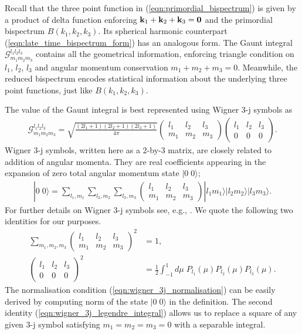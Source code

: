 Recall that the three point function in (\ref{eqn:primordial_bispectrum}) is given by a product of delta function enforcing $\mathbf{k}_1 + \mathbf{k}_2 + \mathbf{k}_3 = \mathbf{0}$ and the primordial bispectrum $B(k_1,k_2,k_3)$. Its spherical harmonic counterpart (\ref{eqn:late_time_bispectrum_form}) has an analogous form. The Gaunt integral $\mathcal{G}^{l_1 l_2 l_3}_{m_1 m_2 m_3}$ contains all the geometrical information, enforcing triangle condition on $l_1$, $l_2$, $l_3$ and angular momentum conservation $m_1+m_2+m_3=0$. Meanwhile, the reduced bispectrum encodes statistical information about the underlying three point functions, just like $B(k_1,k_2,k_3)$.

The value of the Gaunt integral is best represented using Wigner 3-j symbols as
\begin{align}
	\mathcal{G}^{l_1 l_2 l_3}_{m_1 m_2 m_3} = \sqrt{\frac{(2l_1+1)(2l_2+1)(2l_3+1)}{4\pi}} \begin{pmatrix}	l_1 & l_2 & l_3 \\ m_1 & m_2 & m_3 \end{pmatrix} \begin{pmatrix}	l_1 & l_2 & l_3 \\ 0 & 0 & 0 \end{pmatrix}.
\end{align}
Wigner 3-j symbols, written here as a 2-by-3 matrix, are closely related to addition of angular momenta. They are real coefficients appearing in the expansion of zero total angular momentum state $|0 \; 0\rangle$;
\begin{align}
	| 0 \; 0 \rangle = \sum_{l_1,m_1} \sum_{l_2,m_2} \sum_{l_3,m_3} \begin{pmatrix}	l_1 & l_2 & l_3 \\ m_1 & m_2 & m_3 \end{pmatrix} | l_1 m_1 \rangle | l_2 m_2 \rangle | l_3 m_3 \rangle.
\end{align}
For further details on Wigner 3-j symbols see, e.g., \cite{Olver2010nist}. We quote the following two identities for our purposes.
\begin{align}
	\sum_{m_1,m_2,m_3} { \begin{pmatrix}	l_1 & l_2 & l_3 \\ m_1 & m_2 & m_3 \end{pmatrix} }^2 &= 1, \label{eqn:wigner_3j_normalisation} \\
	{ \begin{pmatrix}	l_1 & l_2 & l_3 \\ 0 & 0 & 0 \end{pmatrix} }^2 &= \frac{1}{2} \int_{-1}^{1} d\mu \; P_{l_1}(\mu) P_{l_2}(\mu) P_{l_3}(\mu). \label{eqn:wigner_3j_legendre_integral} 
\end{align}
The normalisation condition (\ref{eqn:wigner_3j_normalisation}) can be easily derived by computing norm of the state $|0 \; 0 \rangle$ in the definition. The second identity (\ref{eqn:wigner_3j_legendre_integral}) allows us to replace a square of any given 3-j symbol satisfying $m_1=m_2=m_3=0$ with a separable integral.

